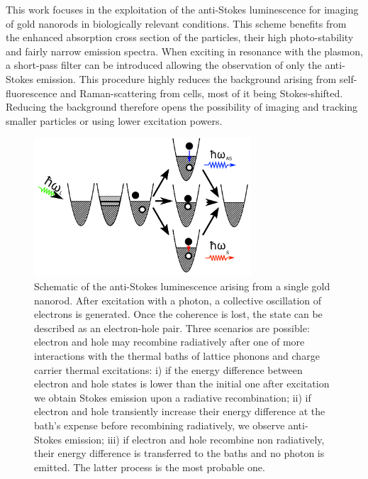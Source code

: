 This work focuses in the exploitation of the anti-Stokes
luminescence\cite{Jiang2013} for imaging of gold nanorods in biologically
relevant conditions. This scheme benefits from the enhanced absorption cross
section of the particles, their high photo-stability and fairly narrow emission
spectra. When exciting in resonance with the plasmon, a short-pass filter can be
introduced allowing the observation of only the anti-Stokes emission. This
procedure highly reduces the background arising from
self-fluorescence and Raman-scattering from cells, most of it being
Stokes-shifted. Reducing the background therefore opens the possibility of
imaging and tracking smaller particles or using lower excitation powers.

\begin{figure}[tp] \centering
\includegraphics[width=8.1cm]{Chapters/03_Background_Free/Figures/02_Scheme/luminescence_all_AS.png}
\caption{Schematic of the anti-Stokes luminescence arising from a single gold
nanorod. After excitation with a photon, a collective oscillation of electrons
is generated. Once the coherence is lost, the state can be described as an
electron-hole pair. Three scenarios are possible: electron and hole may
recombine radiatively after one of more interactions with the thermal baths of
lattice phonons and charge carrier thermal excitations: i) if the energy
difference between electron and hole states is lower than the initial one after
excitation we obtain Stokes emission upon a radiative recombination; ii) if
electron and hole transiently increase their energy difference at the bath's
expense before recombining radiatively, we observe anti-Stokes emission; iii) if
electron and hole recombine non radiatively, their energy difference is
transferred to the baths and no photon is emitted. The latter process is the
most probable one.}
	\label{fig:anti-Stokes-process}
\end{figure}


